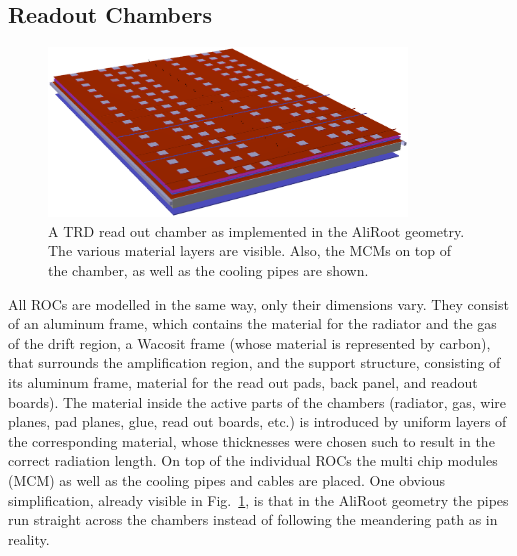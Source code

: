 \documentclass{alicetdr}
\begin{document}
\subsection{Readout Chambers}
\label{GEO:rocs}
%
\begin{figure}[htb]
\begin{center}
\includegraphics[width=0.85\textwidth]{plots/geo_roc.eps}
\end{center}
\caption{
A TRD read out chamber as implemented in the AliRoot geometry.  The
various material layers are visible.  Also, the MCMs on top of the
chamber, as well as the cooling pipes are shown.
}
\label{FIG_GEO:roc_geom}
\end{figure}
%
All ROCs are modelled in the same way, only their dimensions vary.  
They consist of an aluminum frame, which contains the material for 
the radiator and the gas of the drift region, a Wacosit frame (whose 
material is represented by carbon), that surrounds the amplification 
region, and the support structure, consisting of its aluminum frame, 
material for the read out pads, back panel, and readout boards).  The 
material inside the active parts of the chambers (radiator, gas, wire 
planes, pad planes, glue, read out boards, etc.) is introduced by 
uniform layers of the corresponding material, whose thicknesses were 
chosen such to result in the correct radiation length.  On top of the
individual ROCs the multi chip modules (MCM) as well as the cooling 
pipes and cables are placed.  One obvious simplification, already visible
in Fig.~\ref{FIG_GEO:roc_geom}, is that in the AliRoot geometry the pipes
run straight across the chambers instead of following the meandering path 
as in reality.
%
\end{document}
